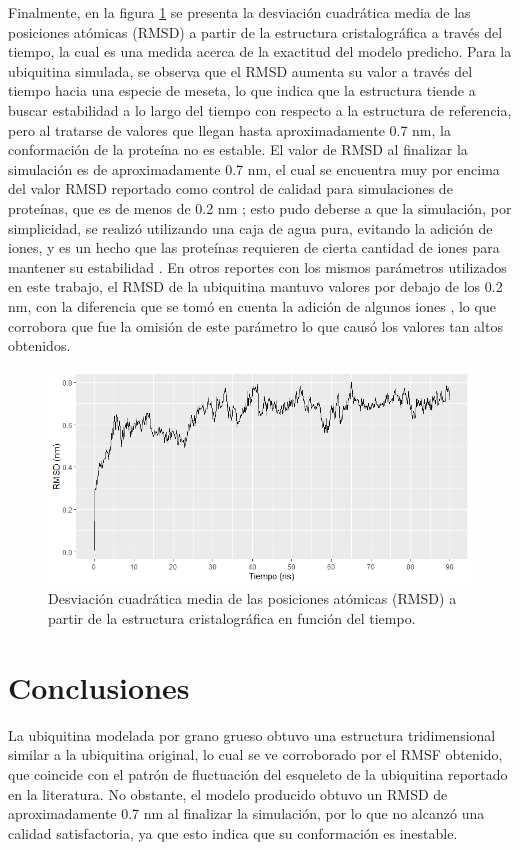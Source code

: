 \documentclass[3pt,twocolumn]{elsarticle}
\begin{document}
Finalmente, en la figura \ref{rmsd} se presenta la desviación cuadrática media de las posiciones atómicas (RMSD) a partir de la estructura cristalográfica a través del tiempo, la cual es una medida acerca de la exactitud del modelo predicho. Para la ubiquitina simulada, se observa que el RMSD aumenta su valor a través del tiempo hacia una especie de meseta, lo que indica que la estructura tiende a buscar estabilidad a lo largo del tiempo con respecto a la estructura de referencia, pero al tratarse de valores que llegan hasta aproximadamente 0.7 nm, la conformación de la proteína no es estable. El valor de RMSD al finalizar la simulación es de aproximadamente 0.7 nm, el cual se encuentra muy por encima del valor RMSD reportado como control de calidad para simulaciones de proteínas, que es de menos de 0.2 nm \cite{spoel}; esto pudo deberse a que la simulación, por simplicidad, se realizó utilizando una caja de agua pura, evitando la adición de iones, y es un hecho que las proteínas requieren de cierta cantidad de iones para mantener su estabilidad \cite{sales}. En otros reportes con los mismos parámetros utilizados en este trabajo, el RMSD de la ubiquitina mantuvo valores por debajo de los 0.2 nm, con la diferencia que se tomó en cuenta la adición de algunos iones \cite{simuubq}, lo que corrobora que fue la omisión de este parámetro lo que causó los valores tan altos obtenidos.

\begin{figure}[ptb]
\begin{center}
\includegraphics[width=\linewidth]{rmsd.png}
\end{center}
\caption{Desviación cuadrática media de las posiciones atómicas (RMSD) a partir de la estructura cristalográfica en función del tiempo.\label{rmsd}}
\end{figure}


\section{Conclusiones}
La ubiquitina modelada por grano grueso obtuvo una estructura tridimensional similar a la ubiquitina original, lo cual se ve corroborado por el RMSF obtenido, que coincide con el patrón de fluctuación del esqueleto de la ubiquitina reportado en la literatura. No obstante, el modelo producido obtuvo un RMSD de aproximadamente 0.7 nm al finalizar la simulación, por lo que no alcanzó una calidad satisfactoria, ya que esto indica que su conformación es inestable.
\end{document}
